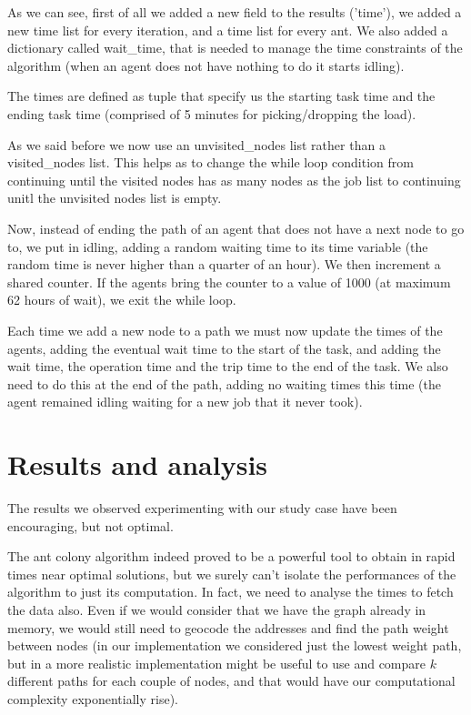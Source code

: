 \documentclass[titlepage]{article}
\begin{document}
As we can see, first of all we added a new field to the results ('time'), we added a new time list for every iteration, and a time list for every ant. We also added a dictionary called wait\_time, that is needed to manage the time constraints of the algorithm (when an agent does not have nothing to do it starts idling).

The times are defined as tuple that specify us the starting task time and the ending task time (comprised of 5 minutes for picking/dropping the load).

As we said before we now use an unvisited\_nodes list rather than a visited\_nodes list. This helps as to change the while loop condition from continuing until the visited nodes has as many nodes as the job list to continuing unitl the unvisited nodes list is empty.

Now, instead of ending the path of an agent that does not have a next node to go to, we put in idling, adding a random waiting time to its time variable (the random time is never higher than a quarter of an hour). We then increment a shared counter. If the agents bring the counter to a value of 1000 (at maximum 62 hours of wait), we exit the while loop.

Each time we add a new node to a path we must now update the times of the agents, adding the eventual wait time to the start of the task, and adding the wait time, the operation time and the trip time to the end of the task. We also need to do this at the end of the path, adding no waiting times this time (the agent remained idling waiting for a new job that it never took).

\section{Results and analysis}
The results we observed experimenting with our study case have been encouraging, but not optimal.

The ant colony algorithm indeed proved to be a powerful tool to obtain in rapid times near optimal solutions, but we surely can't isolate the performances of the algorithm to just its computation. In fact, we need to analyse the times to fetch the data also. Even if we would consider that we have the graph already in memory, we would still need to geocode the addresses and find the path weight between nodes (in our implementation we considered just the lowest weight path, but in a more realistic implementation might be useful to use and compare $k$ different paths for each couple of nodes, and that would have our computational complexity exponentially rise).
\end{document}

